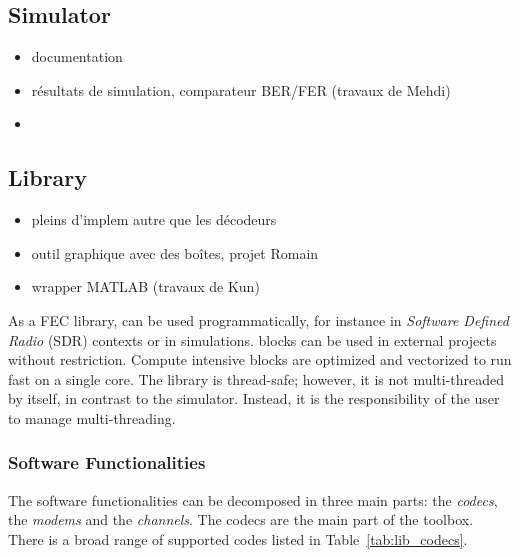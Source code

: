 \subsection{Simulator}

\begin{itemize}
  \item documentation
  \item résultats de simulation, comparateur BER/FER (travaux de Mehdi)
  \item \cite{Cassagne2017,Cassagne2017a}
\end{itemize}

\subsection{Library}

\begin{itemize}
  \item pleins d'implem autre que les décodeurs
  \item outil graphique avec des boîtes, projet Romain
  \item wrapper MATLAB (travaux de Kun)
\end{itemize}

As a FEC library, \AFFECT can be used programmatically, for instance in
\emph{Software Defined Radio} (SDR) contexts or in simulations. \AFFECT blocks
can be used in external projects without restriction. Compute intensive blocks
are optimized and vectorized to run fast on a single core. The library is
thread-safe; however, it is not multi-threaded by itself, in contrast to the
simulator. Instead, it is the responsibility of the user to manage
multi-threading.

\subsubsection{Software Functionalities}

The \AFFECT software functionalities can be decomposed in three main parts: the
\textit{codecs}, the \textit{modems} and the \textit{channels}. The codecs are
the main part of the toolbox. There is a broad range of supported codes listed
in Table~\ref{tab:lib_codecs}.

